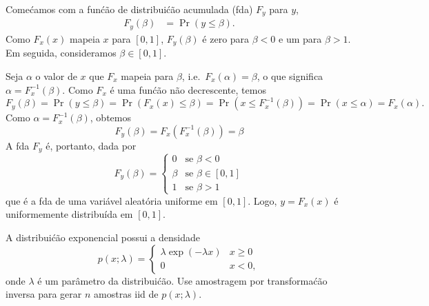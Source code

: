 \begin{solution}
    Come\'camos com a fun\'c\~ao de distribui\'c\~ao acumulada (fda) $F_y$ para $y$,
    \begin{align}
        F_y(\beta) & = \Pr( y \le \beta).
    \end{align}
    Como $F_x(x)$ mapeia $x$ para $[0,1]$, $F_y(\beta)$ \'e zero para $\beta < 0$ e um para $\beta > 1$. Em seguida, consideramos $\beta \in [0,1]$.
    
    Seja $\alpha$ o valor de $x$ que $F_x$ mapeia para $\beta$, i.e.\ $F_x(\alpha) = \beta$, o que significa $\alpha = F_x^{-1}(\beta)$. Como $F_x$ \'e uma fun\'c\~ao n\~ao decrescente, temos
    \begin{equation}
        F_y(\beta) = \Pr( y \le \beta) = \Pr( F_x(x) \le \beta) = \Pr(x \le F_x^{-1}(\beta)) = \Pr( x \le \alpha) = F_x(\alpha).
    \end{equation}
    Como $\alpha = F_x^{-1}(\beta)$, obtemos
    \begin{equation}
        F_y(\beta)  =  F_x( F_x^{-1}(\beta) ) = \beta
    \end{equation}
    A fda $F_y$ \'e, portanto, dada por
    \begin{equation}
        F_y(\beta) = \begin{cases}
            0 & \text{se } \beta < 0\\
            \beta & \text{se } \beta \in [0,1]\\
            1 & \text{se } \beta > 1
        \end{cases}
    \end{equation}
    que \'e a fda de uma vari\'avel aleat\'oria uniforme em $[0,1]$. Logo, $y=F_x(x)$ \'e uniformemente distribu\'ida em $[0,1]$.
    
\end{solution}



A distribui\'c\~ao exponencial possui a densidade
\begin{equation}
    p(x; \lambda) = \begin{cases} \lambda \exp(-\lambda x) & x \ge 0\\ 0
        & x<0,
    \end{cases}
\end{equation}
onde $\lambda$ \'e um par\^ametro da distribui\'c\~ao. Use amostragem por transforma\'c\~ao inversa para gerar $n$ amostras iid de $p(x; \lambda)$.


